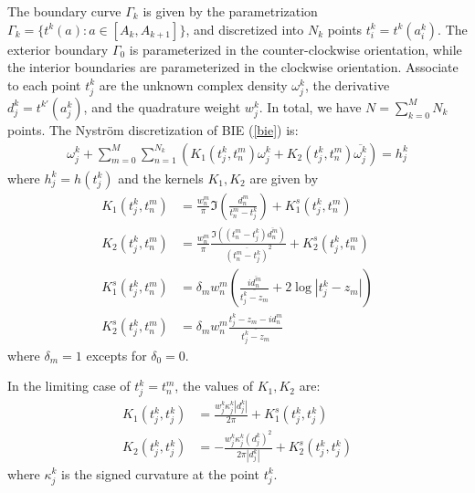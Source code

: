 \documentclass[10pt,twocolumn,letterpaper]{article}
\begin{document}
The boundary curve $\Gamma_k$ is given by the parametrization $\Gamma_k = \{
  t^k(a): a\in \left[A_k,A_{k+1}\right]\}$, 
  and discretized into $N_k$ points $t^k_i = t^k(a^k_i)$.
The exterior boundary $\Gamma_0$ is parameterized in the counter-clockwise orientation, while the interior boundaries
are parameterized in the clockwise orientation.
Associate to each point $t^k_j$ are the unknown complex density $\omega^k_j$, 
  the derivative $d^k_j = t^{k\prime}(a^k_j)$, 
  and the quadrature weight $w^k_j$. 
In total, we have $N= \sum_{k=0}^M N_k$ points. 
The Nystr\"om discretization of BIE (\ref{bie}) is:
\begin{align}
  \omega_j^k
  + \sum_{m=0}^{M} \sum_{n=1}^{N_k} 
    \left(K_1(t^k_j,t^m_n) \omega^k_j
    + K_2(t^k_j,t^m_n) \overline{\omega^k_j}\right) = h^k_j 
  \label{nystrom}
\end{align} where $h^k_j = h(t^k_j)$ and the kernels $K_1, K_2$ are given by
\begin{align}
  K_1(t^k_j, t^m_n)
   & = \frac{w^m_n}{\pi} \Im (\frac{d^m_n}{t^m_n-t^k_j}) + K_1^s(t^k_j,t^m_n)\\
  K_2(t^k_j, t^m_n)
   & = \frac{w^m_n}{\pi} \frac{\Im((t^m_n-t^k_j)\overline{d^m_n})}{\overline{(t^m_n - t^k_j)}^2}  + K_2^s(t^k_j,t^m_n)\\
  K_1^s(t^k_j,t^m_n) 
    & = \delta_m w^m_n \left(\frac{i\overline{d^m_n}}{\overline{t^k_j - z_m}}
    + 2 \log |t^k_j - z_m| \right)\\
  K_2^s(t^k_j,t^m_n) 
    & = \delta_{m}w^m_n \frac{t^k_j-z_m-id^m_n}{\overline{t^k_j - z_m}}
\end{align}
where $\delta_m = 1$ excepts for $\delta_0 = 0$. 

In the limiting case of $t^k_j = t^m_n$, the values of $K_1,K_2$ are:
\begin{align}
  K_1(t^k_j, t^k_j) 
    & = \frac{w^k_j \kappa^k_j|d^k_j|}{2\pi} + K_1^s(t^k_j,t^k_j)\\
  K_2(t^k_j, t^k_j) 
    & = -\frac{w^k_j\kappa^k_j{(d^{k}_j)}^2}{2\pi|d^k_j|} + K_2^s(t^k_j,t^k_j)
\end{align}where $\kappa^k_j$ is the signed curvature at the point $t^k_j$.
\end{document}
